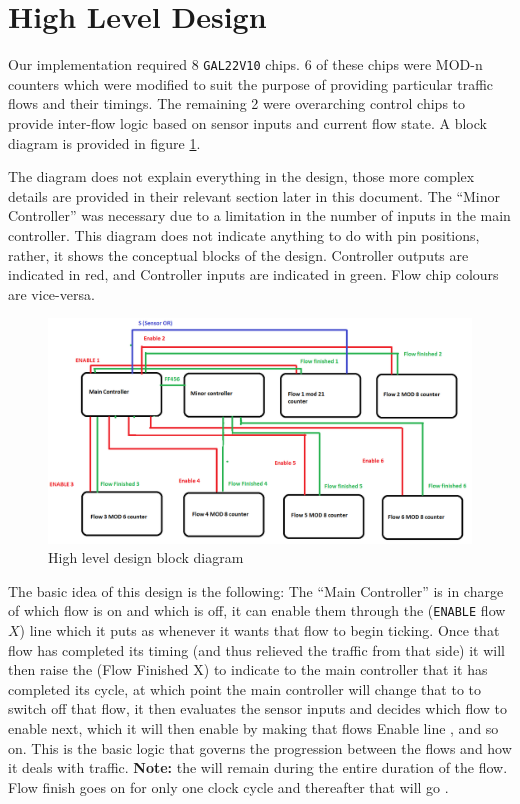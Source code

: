 \section{High Level Design}
Our implementation required 8 \texttt{GAL22V10} chips. 6 of these chips were
MOD-n counters which were modified to suit the purpose of providing particular
traffic flows and their timings. The remaining 2 were overarching control chips
to provide inter-flow logic based on sensor inputs and current flow state. A
block diagram is provided in figure \ref{fig:overall-design}.

The diagram does not explain everything in the design, those more complex
details are provided in their relevant section later in this document. The
``Minor Controller'' was necessary due to a limitation in the number of inputs
in the main controller. This diagram does not indicate anything to do with pin
positions, rather, it shows the conceptual blocks of the design. Controller
outputs are indicated in red, and Controller inputs are indicated in green. Flow
chip colours are vice-versa.

\begin{figure}[!t]
\includegraphics[width=\linewidth]{img/LJNpzV.png}
\caption{High level design block diagram}
\label{fig:overall-design}
\end{figure}

The basic idea of this design is the following: The ``Main Controller'' is in
charge of which flow is on and which is off, it can enable them through the \ENX
(\texttt{ENABLE} flow $X$) line which it puts as \HIGH whenever it wants that
flow to begin ticking. Once that flow has completed its timing (and thus
relieved the traffic from that side) it will then raise the \FFX (Flow
Finished X) to indicate to the main controller that it has completed its cycle,
at which point the main controller will change that \ENX to \LOW to switch off
that flow, it then evaluates the sensor inputs and decides which flow to enable
next, which it will then enable by making that flows Enable line \HIGH, and so
on. This is the basic logic that governs the progression between the flows and
how it deals with traffic. \textbf{Note:} the \ENX will remain \HIGH during the
entire duration of the flow. Flow finish goes on for only one clock cycle and
thereafter that \ENX will go \LOW.